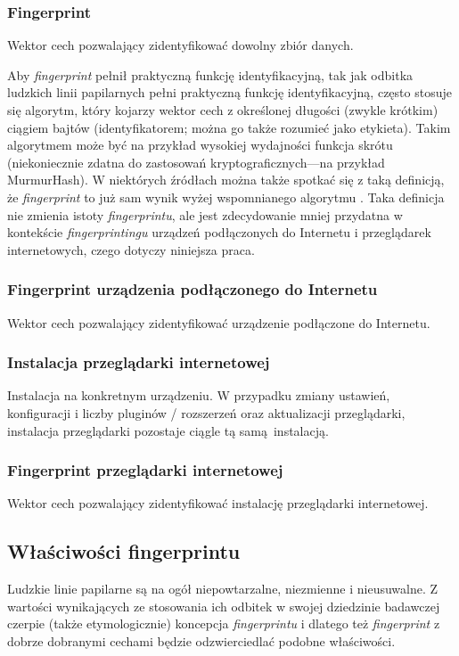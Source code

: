 \subsubsection{Fingerprint}
Wektor cech pozwalający zidentyfikować dowolny zbiór danych.

Aby \emph{fingerprint} pełnił praktyczną funkcję identyfikacyjną, tak jak
odbitka ludzkich linii papilarnych pełni praktyczną funkcję identyfikacyjną,
często stosuje się algorytm, który kojarzy wektor cech z określonej długości
(zwykle krótkim) ciągiem bajtów (identyfikatorem; można go także rozumieć jako
etykieta). Takim algorytmem może być na przykład wysokiej wydajności funkcja
skrótu (niekoniecznie zdatna do zastosowań kryptograficznych---na przykład
MurmurHash). W niektórych źródłach można także spotkać się z taką definicją, że
\emph{fingerprint} to już sam wynik wyżej wspomnianego algorytmu
\cite[s. 123--132]{wu2018beauty}. Taka definicja nie zmienia istoty
\emph{fingerprintu}, ale jest zdecydowanie mniej przydatna w kontekście
\emph{fingerprintingu} urządzeń podłączonych do Internetu i przeglądarek
internetowych, czego dotyczy niniejsza praca.

\subsubsection{Fingerprint urządzenia podłączonego do Internetu}
Wektor cech pozwalający zidentyfikować urządzenie podłączone do Internetu.

\subsubsection{Instalacja przeglądarki internetowej}
Instalacja na konkretnym urządzeniu. W przypadku zmiany ustawień, konfiguracji i
liczby pluginów / rozszerzeń oraz aktualizacji przeglądarki, instalacja
przeglądarki pozostaje ciągle tą samą instalacją.

\subsubsection{Fingerprint przeglądarki internetowej}
Wektor cech pozwalający zidentyfikować instalację przeglądarki internetowej.

\subsection{Właściwości fingerprintu}
Ludzkie linie papilarne są na ogół niepowtarzalne, niezmienne i nieusuwalne. Z
wartości wynikających ze stosowania ich odbitek w swojej dziedzinie badawczej
czerpie (także etymologicznie) koncepcja \emph{fingerprintu} i dlatego też
\emph{fingerprint} z dobrze dobranymi cechami będzie odzwierciedlać podobne
właściwości.

